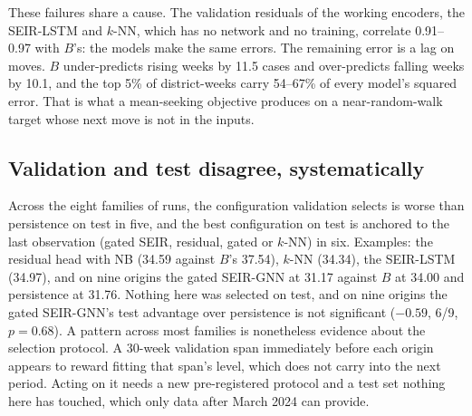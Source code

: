 These failures share a cause. The validation residuals of the working encoders,
the SEIR-LSTM and $k$-NN, which has no network and no training, correlate
0.91--0.97 with $B$'s: the models make the same errors. The remaining error is a
lag on moves. $B$ under-predicts rising weeks by 11.5 cases and over-predicts
falling weeks by 10.1, and the top 5\% of district-weeks carry 54--67\% of every
model's squared error. That is what a mean-seeking objective produces on a
near-random-walk target whose next move is not in the inputs.

\subsection{Validation and test disagree, systematically}
\label{sec:valtest}
Across the eight families of runs, the configuration validation selects is worse
than persistence on test in five, and the best configuration on test is anchored
to the last observation (gated SEIR, residual, gated or $k$-NN) in six.
Examples: the residual head with NB (34.59 against $B$'s 37.54), $k$-NN (34.34),
the SEIR-LSTM (34.97), and on nine origins the gated SEIR-GNN at 31.17 against
$B$ at 34.00 and persistence at 31.76. Nothing here was selected on test, and on
nine origins the gated SEIR-GNN's test advantage over persistence is not
significant ($-0.59$, 6/9, $p=0.68$). A pattern across most families is
nonetheless evidence about the selection protocol. A 30-week validation span
immediately before each origin appears to reward fitting that span's level,
which does not carry into the next period. Acting on it needs a new
pre-registered protocol and a test set nothing here has touched, which only data
after March 2024 can provide.
